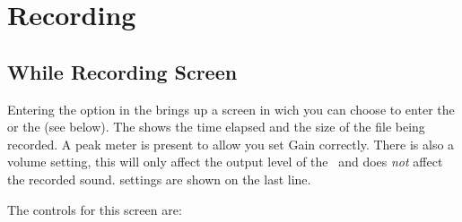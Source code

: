 \section{\label{ref:Recording}Recording}
  \subsection{\label{ref:Whilerecordingscreen}While Recording Screen}

  Entering the  option in the  brings up
  a screen in wich you can choose to enter the  or
  the  (see below). The 
  shows the time elapsed and the size of the file being recorded. A peak meter
  is present to allow you set Gain correctly. There is also a volume setting,
  this will only affect the output level of the \dap\ and does \emph{not}
  affect the recorded sound.
   settings are shown on the last line.
  
  The controls for this screen are:
  
